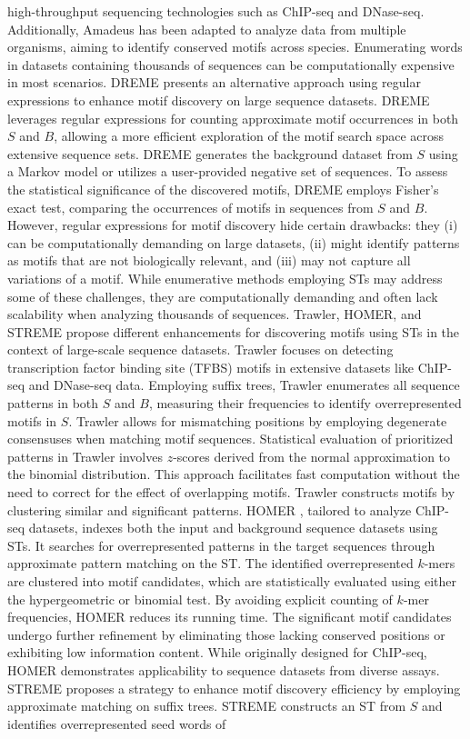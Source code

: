 \documentclass[a4paper, titlepage, openright]{book}
\begin{document}
high-throughput sequencing technologies such as ChIP-seq and DNase-seq. Additionally, Amadeus has been adapted to analyze data from multiple organisms, aiming to identify conserved motifs across species. Enumerating words in datasets containing thousands of sequences can be computationally expensive in most scenarios. DREME \citep{bailey2011dreme} presents an alternative approach using regular expressions to enhance motif discovery on large sequence datasets. DREME leverages regular expressions for counting approximate motif occurrences in both $S$ and $B$, allowing a more efficient exploration of the motif search space across extensive sequence sets. DREME generates the background dataset from $S$ using a Markov model or utilizes a user-provided negative set of sequences. To assess the statistical significance of the discovered motifs, DREME employs Fisher’s exact test, comparing the occurrences of motifs in sequences from $S$ and $B$. However, regular expressions for motif discovery hide certain drawbacks: they (i) can be computationally demanding on large datasets, (ii) might identify patterns as motifs that are not biologically relevant, and (iii) may not capture all variations of a motif. While enumerative methods employing STs may address some of these challenges, they are computationally demanding and often lack scalability when analyzing thousands of sequences. Trawler, HOMER, and STREME \citep{ettwiller2007trawler,heinz2010simple,bailey2021streme} propose different enhancements for discovering motifs using STs in the context of large-scale sequence datasets. Trawler \citep{ettwiller2007trawler} focuses on detecting transcription factor binding site (TFBS) motifs in extensive datasets like ChIP-seq and DNase-seq data. Employing suffix trees, Trawler enumerates all sequence patterns in both $S$ and $B$, measuring their frequencies to identify overrepresented motifs in $S$. Trawler allows for mismatching positions by employing degenerate consensuses when matching motif sequences. Statistical evaluation of prioritized patterns in Trawler involves $z$-scores derived from the normal approximation to the binomial distribution. This approach facilitates fast computation without the need to correct for the effect of overlapping motifs. Trawler constructs motifs by clustering similar and significant patterns. HOMER \citep{heinz2010simple}, tailored to analyze ChIP-seq datasets, indexes both the input and background sequence datasets using STs. It searches for overrepresented patterns in the target sequences through approximate pattern matching on the ST. The identified overrepresented $k$-mers are clustered into motif candidates, which are statistically evaluated using either the hypergeometric or binomial test. By avoiding explicit counting of $k$-mer frequencies, HOMER reduces its running time. The significant motif candidates undergo further refinement by eliminating those lacking conserved positions or exhibiting low information content. While originally designed for ChIP-seq, HOMER demonstrates applicability to sequence datasets from diverse assays. STREME \citep{bailey2021streme} proposes a strategy to enhance motif discovery efficiency by employing approximate matching on suffix trees. STREME constructs an ST from $S$ and identifies overrepresented seed words of 
\end{document}
